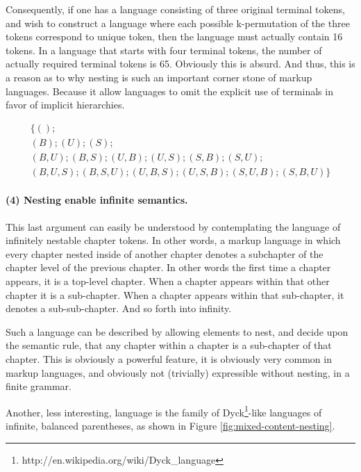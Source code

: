 \documentclass{scrreprt}
\begin{document}
Consequently, if one has a language consisting of three original terminal tokens, and wish to construct a language where each possible k-permutation of the three tokens correspond to unique token, then the language must actually contain 16 tokens. In a language that starts with four terminal tokens, the number of actually required terminal tokens is 65. Obviously this is absurd. And thus, this is a reason as to why nesting is such an important corner stone of markup languages. Because it allow languages to omit the explicit use of terminals in favor of implicit hierarchies.




\begin{equation}
\begin{split}
\{
(); \\
(B);
(U);
(S); \\
(B,U);
(B,S);
(U,B);
(U,S);
(S,B);
(S,U); \\
(B,U,S);
(B,S,U);
(U,B,S);
(U,S,B);
(S,U,B);
(S,B,U)
\}
\label{eq:all-tuples}
\end{split}
\end{equation}






\paragraph{(4) Nesting enable infinite semantics.}
This last argument can easily be understood by contemplating the language of infinitely nestable chapter tokens. In other words, a markup language in which every chapter nested inside of another chapter denotes a subchapter of the chapter level of the previous chapter. In other words the first time a chapter appears, it is a top-level chapter. When a chapter appears within that other chapter it is a sub-chapter. When a chapter appears within that sub-chapter, it denotes a sub-sub-chapter. And so forth into infinity.

Such a language can be described by allowing elements to nest, and decide upon the semantic rule, that any chapter within a chapter is a sub-chapter of that chapter. This is obviously a powerful feature, it is obviously very common in markup languages, and obviously not (trivially) expressible without nesting, in a finite grammar.

Another, less interesting, language is the family of Dyck\footnote{http://en.wikipedia.org/wiki/Dyck\_language}-like languages of infinite, balanced parentheses, as shown in Figure \ref{fig:mixed-content-nesting}.
\end{document}
